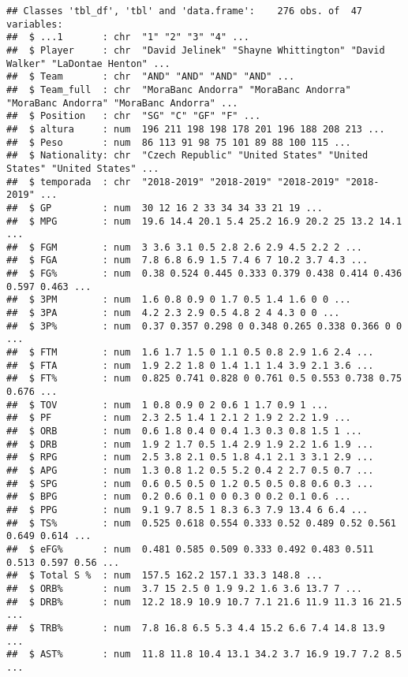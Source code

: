 \documentclass[]{article}
\begin{document}
\begin{verbatim}
## Classes 'tbl_df', 'tbl' and 'data.frame':    276 obs. of  47 variables:
##  $ ...1       : chr  "1" "2" "3" "4" ...
##  $ Player     : chr  "David Jelinek" "Shayne Whittington" "David Walker" "LaDontae Henton" ...
##  $ Team       : chr  "AND" "AND" "AND" "AND" ...
##  $ Team_full  : chr  "MoraBanc Andorra" "MoraBanc Andorra" "MoraBanc Andorra" "MoraBanc Andorra" ...
##  $ Position   : chr  "SG" "C" "GF" "F" ...
##  $ altura     : num  196 211 198 198 178 201 196 188 208 213 ...
##  $ Peso       : num  86 113 91 98 75 101 89 88 100 115 ...
##  $ Nationality: chr  "Czech Republic" "United States" "United States" "United States" ...
##  $ temporada  : chr  "2018-2019" "2018-2019" "2018-2019" "2018-2019" ...
##  $ GP         : num  30 12 16 2 33 34 34 33 21 19 ...
##  $ MPG        : num  19.6 14.4 20.1 5.4 25.2 16.9 20.2 25 13.2 14.1 ...
##  $ FGM        : num  3 3.6 3.1 0.5 2.8 2.6 2.9 4.5 2.2 2 ...
##  $ FGA        : num  7.8 6.8 6.9 1.5 7.4 6 7 10.2 3.7 4.3 ...
##  $ FG%        : num  0.38 0.524 0.445 0.333 0.379 0.438 0.414 0.436 0.597 0.463 ...
##  $ 3PM        : num  1.6 0.8 0.9 0 1.7 0.5 1.4 1.6 0 0 ...
##  $ 3PA        : num  4.2 2.3 2.9 0.5 4.8 2 4 4.3 0 0 ...
##  $ 3P%        : num  0.37 0.357 0.298 0 0.348 0.265 0.338 0.366 0 0 ...
##  $ FTM        : num  1.6 1.7 1.5 0 1.1 0.5 0.8 2.9 1.6 2.4 ...
##  $ FTA        : num  1.9 2.2 1.8 0 1.4 1.1 1.4 3.9 2.1 3.6 ...
##  $ FT%        : num  0.825 0.741 0.828 0 0.761 0.5 0.553 0.738 0.75 0.676 ...
##  $ TOV        : num  1 0.8 0.9 0 2 0.6 1 1.7 0.9 1 ...
##  $ PF         : num  2.3 2.5 1.4 1 2.1 2 1.9 2 2.2 1.9 ...
##  $ ORB        : num  0.6 1.8 0.4 0 0.4 1.3 0.3 0.8 1.5 1 ...
##  $ DRB        : num  1.9 2 1.7 0.5 1.4 2.9 1.9 2.2 1.6 1.9 ...
##  $ RPG        : num  2.5 3.8 2.1 0.5 1.8 4.1 2.1 3 3.1 2.9 ...
##  $ APG        : num  1.3 0.8 1.2 0.5 5.2 0.4 2 2.7 0.5 0.7 ...
##  $ SPG        : num  0.6 0.5 0.5 0 1.2 0.5 0.5 0.8 0.6 0.3 ...
##  $ BPG        : num  0.2 0.6 0.1 0 0 0.3 0 0.2 0.1 0.6 ...
##  $ PPG        : num  9.1 9.7 8.5 1 8.3 6.3 7.9 13.4 6 6.4 ...
##  $ TS%        : num  0.525 0.618 0.554 0.333 0.52 0.489 0.52 0.561 0.649 0.614 ...
##  $ eFG%       : num  0.481 0.585 0.509 0.333 0.492 0.483 0.511 0.513 0.597 0.56 ...
##  $ Total S %  : num  157.5 162.2 157.1 33.3 148.8 ...
##  $ ORB%       : num  3.7 15 2.5 0 1.9 9.2 1.6 3.6 13.7 7 ...
##  $ DRB%       : num  12.2 18.9 10.9 10.7 7.1 21.6 11.9 11.3 16 21.5 ...
##  $ TRB%       : num  7.8 16.8 6.5 5.3 4.4 15.2 6.6 7.4 14.8 13.9 ...
##  $ AST%       : num  11.8 11.8 10.4 13.1 34.2 3.7 16.9 19.7 7.2 8.5 ...

\end{verbatim}
\end{document}
